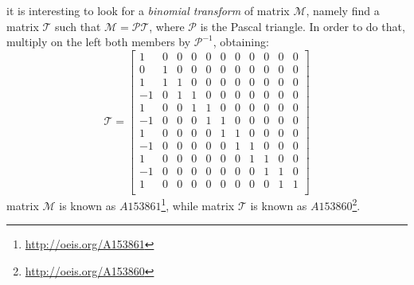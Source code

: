 it is interesting to look for a \emph{binomial transform} of
matrix $\mathcal{M}$, namely find a matrix $\mathcal{T}$ such that
$\mathcal{M} = \mathcal{P}\mathcal{T}$, where $\mathcal{P}$ is 
the Pascal triangle. In order to do that, multiply on the left
both members by $\mathcal{P}^{-1}$, obtaining:
\begin{displaymath}
    \mathcal{T} = \left[\begin{array}{ccccccccccc}
        1 & 0 & 0 & 0 & 0 & 0 & 0 & 0 & 0 & 0 & 0\\
        0 & 1 & 0 & 0 & 0 & 0 & 0 & 0 & 0 & 0 & 0\\
        1 & 1 & 1 & 0 & 0 & 0 & 0 & 0 & 0 & 0 & 0\\
        -1 & 0 & 1 & 1 & 0 & 0 & 0 & 0 & 0 & 0 & 0\\
        1 & 0 & 0 & 1 & 1 & 0 & 0 & 0 & 0 & 0 & 0\\
        -1 & 0 & 0 & 0 & 1 & 1 & 0 & 0 & 0 & 0 & 0\\
        1 & 0 & 0 & 0 & 0 & 1 & 1 & 0 & 0 & 0 & 0\\
        -1 & 0 & 0 & 0 & 0 & 0 & 1 & 1 & 0 & 0 & 0\\
        1 & 0 & 0 & 0 & 0 & 0 & 0 & 1 & 1 & 0 & 0\\
        -1 & 0 & 0 & 0 & 0 & 0 & 0 & 0 & 1 & 1 & 0\\
        1 & 0 & 0 & 0 & 0 & 0 & 0 & 0 & 0 & 1 & 1\\
    \end{array}\right]
\end{displaymath}
matrix $\mathcal{M}$ is known as $A153861$\footnote{\url{http://oeis.org/A153861}},
while matrix $\mathcal{T}$ is known as $A153860$\footnote{\url{http://oeis.org/A153860}}.

